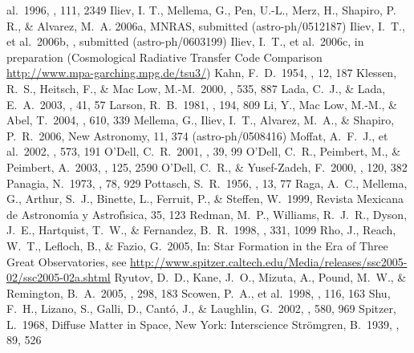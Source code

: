 \documentclass[proceedings, preprint]{rmaa}
\begin{document}
\begin{thebibliography}
al.\ 1996, \aj, 111, 2349 
 Iliev, I. T., Mellema, G.,
  Pen, U.-L., Merz, H., Shapiro, P. R., \& Alvarez, M.~A.  2006a,
  MNRAS, submitted (astro-ph/0512187)
 Iliev, I.~T., et
  al.\ 2006b, \mnras, submitted (astro-ph/0603199)
 Iliev, I.~T., et
  al.\ 2006c, in preparation (Cosmological Radiative Transfer Code Comparison  
  \url{http://www.mpa-garching.mpg.de/tsu3/})
 Kahn, F.~D.\ 1954, \bain, 12, 187 
 Klessen, R.~S.,
  Heitsch, F., \& Mac Low, M.-M.\ 2000, \apj, 535, 887
 Lada, C.~J., \&
Lada, E.~A.\ 2003, \araa, 41, 57 
 Larson, R.~B.\ 1981,
\mnras, 194, 809 
 Li, Y., Mac Low, M.-M.,
\& Abel, T.\ 2004, \apj, 610, 339 
 Mellema, G.,
  Iliev, I.~T., Alvarez, M.~A., \& Shapiro, P.~R.\ 2006, New
  Astronomy, 11, 374 (astro-ph/0508416)
 Moffat, A.~F.~J., et 
al.\ 2002, \apj, 573, 191 
 O'Dell, C.~R.\ 2001, \araa, 39, 
99 
 O'Dell, C.~R., Peimbert, 
M., \& Peimbert, A.\ 2003, \aj, 125, 2590 
  O'Dell, C.~R., 
\& Yusef-Zadeh, F.\ 2000, \aj, 120, 382 
 Panagia, N.\ 1973, \aj,
78, 929 
 Pottasch, S.~R.\ 1956, \bain, 
13, 77 
 Raga, A.~C., Mellema, G., 
Arthur, S.~J., Binette, L., Ferruit, P., \& Steffen, W.\ 1999, Revista 
Mexicana de Astronom\'\i{}a y Astrof\'\i{}sica, 35, 123
 Redman, M.~P., Williams, 
R.~J.~R., Dyson, J.~E., Hartquist, T.~W., \& Fernandez, B.~R.\ 1998, \aap, 
331, 1099 
 Rho, J., Reach, W.~T., 
Lefloch, B., \& Fazio, G.\ 2005, In: Star Formation in the Era of Three Great 
Observatories, see
\url{http://www.spitzer.caltech.edu/Media/releases/ssc2005-02/ssc2005-02a.shtml}
 Ryutov, D.~D., Kane, 
J.~O., Mizuta, A., Pound, M.~W., \& Remington, B.~A.\ 2005, \apss, 298, 183 
 Scowen, P.~A., et al.\ 
1998, \aj, 116, 163 
 Shu, F.~H., Lizano, S., 
Galli, D., Cant{\'o}, J., \& Laughlin, G.\ 2002, \apj, 580, 969 
\bibitem[Spitzer(1968)]{1968dms..book.....S} Spitzer, L.\ 1968,
  Diffuse Matter in Space, New York: Interscience
 Str{\"o}mgren, B.\ 1939, 
\apj, 89, 526 
\end{thebibliography}
\end{document}
